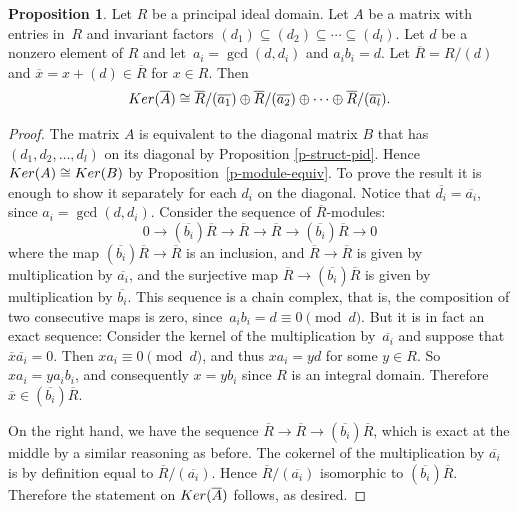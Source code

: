 \documentclass[11pt,a4paper]{article}
\theoremstyle{definition}
\newtheorem{proposition}[theorem]{Proposition}
\newcommand{\Ker}{\textnormal{Ker}}
\begin{document}
\begin{proposition}\label{p-struct-ker-im}
Let $R$ be a principal ideal domain. 
Let $A$ be a matrix with entries in~$R$ and invariant factors $(d_1)\subseteq (d_2)\subseteq \cdots \subseteq (d_l) $. 
Let $d$ be a nonzero element of $R$ and let~$a_i=\gcd (d,d_i)$ and $a_ib_i=d$.
Let $\overline{R}=R/(d)$ and $\overline{x}=x+(d) \in \overline{R}$ for $x\in R$. 
Then
$$
\Ker (\overline{A})  \cong \overline{R}/(\overline{a_1}) \oplus \overline{R}/(\overline{a_2}) \oplus  \cdots \oplus  \overline{R}/(\overline{a_l}).
$$
\end{proposition}
\begin{proof}
The matrix $A$ is equivalent to the diagonal matrix $B$ that has $(d_1,d_2, \ldots ,d_l)$ on its diagonal by Proposition \ref{p-struct-pid}.
Hence $\Ker (A ) \cong \Ker (B)$  by Proposition~\ref{p-module-equiv}.
To prove the result it is enough to show it separately for each $d_i$ on the diagonal. Notice that $\overline{d_i}=\overline{a_i}$, since $a_i=\gcd (d,d_i)$.
Consider the sequence of $\overline{R}$-modules:
$$
0\rightarrow (\overline{b_i})\overline{R} \rightarrow \overline{R} \rightarrow \overline{R} \rightarrow (\overline{b_i})\overline{R} \rightarrow 0
$$
where the map $(\overline{b_i})\overline{R} \rightarrow \overline{R}$ is an inclusion, and $\overline{R} \rightarrow \overline{R}$ is given by multiplication by $\overline{a_i}$,
and the surjective map  $\overline{R} \rightarrow (\overline{b_i})\overline{R} $ is given by multiplication by $\overline{b_i}$. 
This sequence is a chain complex, that is, the composition of two consecutive maps is zero, since~$a_ib_i=d \equiv 0 \pmod d$.
But it is in fact an exact sequence: Consider the kernel of the multiplication by~$\overline{a_i}$ and suppose that $\overline{x}\overline{a_i}=0$. Then $xa_i \equiv 0 \pmod d$, and thus $xa_i = yd$ for some $y\in R$. So~$xa_i = ya_ib_i$, and consequently $x = yb_i$ since $R$ is an integral domain. Therefore $\overline{x} \in (\overline{b_i})\overline{R}$. 

On the right hand, we have the sequence $ \overline{R} \rightarrow \overline{R} \rightarrow (\overline{b_i})\overline{R}$, 
which is exact at the middle by a similar reasoning as before.
The cokernel of the multiplication by $\overline{a_i}$ is by definition equal to $\overline{R}/(\overline{a_i})$.
Hence $\overline{R}/(\overline{a_i})$ isomorphic to $(\overline{b_i})\overline{R}$. Therefore the statement on $\Ker (\overline{A})$ follows, as desired.
\end{proof}
\end{document}
